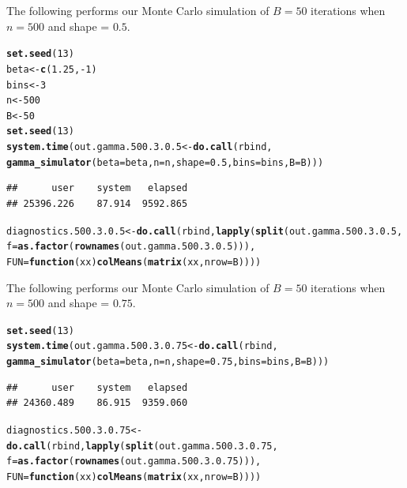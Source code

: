 \documentclass[11pt]{article}\usepackage[]{graphicx}\usepackage[]{color}
\makeatletter
\newcommand{\hlnum}[1]{\textcolor[rgb]{0.686,0.059,0.569}{#1}}%
\newcommand{\hlopt}[1]{\textcolor[rgb]{0,0,0}{#1}}%
\newcommand{\hlstd}[1]{\textcolor[rgb]{0.345,0.345,0.345}{#1}}%
\newcommand{\hlkwa}[1]{\textcolor[rgb]{0.161,0.373,0.58}{\textbf{#1}}}%
\newcommand{\hlkwb}[1]{\textcolor[rgb]{0.69,0.353,0.396}{#1}}%
\newcommand{\hlkwc}[1]{\textcolor[rgb]{0.333,0.667,0.333}{#1}}%
\newcommand{\hlkwd}[1]{\textcolor[rgb]{0.737,0.353,0.396}{\textbf{#1}}}%
\newenvironment{kframe}{%
 \def\at@end@of@kframe{}%
 \ifinner\ifhmode%
  \def\at@end@of@kframe{\end{minipage}}%
  \begin{minipage}{\columnwidth}%
 \fi\fi%
 \def\FrameCommand##1{\hskip\@totalleftmargin \hskip-\fboxsep
 \colorbox{shadecolor}{##1}\hskip-\fboxsep
     \hskip-\linewidth \hskip-\@totalleftmargin \hskip\columnwidth}%
 \MakeFramed {\advance\hsize-\width
   \@totalleftmargin\z@ \linewidth\hsize
   \@setminipage}}%
 {\par\unskip\endMakeFramed%
 \at@end@of@kframe}
\newenvironment{knitrout}{}{} %
\makeatother
\begin{document}
The following performs our Monte Carlo simulation of $B = 50$ iterations 
when $n = 500$ and shape = $0.5$. 

\begin{knitrout}
\color{fgcolor}\begin{kframe}
\begin{alltt}
\hlkwd{set.seed}\hlstd{(}\hlnum{13}\hlstd{)}
\hlstd{beta} \hlkwb{<-} \hlkwd{c}\hlstd{(}\hlnum{1.25}\hlstd{,} \hlopt{-}\hlnum{1}\hlstd{)}
\hlstd{bins} \hlkwb{<-} \hlnum{3}
\hlstd{n} \hlkwb{<-} \hlnum{500}
\hlstd{B} \hlkwb{<-} \hlnum{50}
\hlkwd{set.seed}\hlstd{(}\hlnum{13}\hlstd{)}
\hlkwd{system.time}\hlstd{(out.gamma.500.3.0.5} \hlkwb{<-} \hlkwd{do.call}\hlstd{(rbind,}
  \hlkwd{gamma_simulator}\hlstd{(}\hlkwc{beta} \hlstd{= beta,} \hlkwc{n} \hlstd{= n,} \hlkwc{shape} \hlstd{=} \hlnum{0.5}\hlstd{,} \hlkwc{bins} \hlstd{= bins,} \hlkwc{B} \hlstd{= B)))}
\end{alltt}
\begin{verbatim}
##      user    system   elapsed 
## 25396.226    87.914  9592.865
\end{verbatim}
\begin{alltt}
\hlstd{diagnostics.500.3.0.5} \hlkwb{<-} \hlkwd{do.call}\hlstd{(rbind,} \hlkwd{lapply}\hlstd{(}\hlkwd{split}\hlstd{(out.gamma.500.3.0.5,}
  \hlkwc{f} \hlstd{=} \hlkwd{as.factor}\hlstd{(}\hlkwd{rownames}\hlstd{(out.gamma.500.3.0.5))),}
  \hlkwc{FUN} \hlstd{=} \hlkwa{function}\hlstd{(}\hlkwc{xx}\hlstd{)} \hlkwd{colMeans}\hlstd{(}\hlkwd{matrix}\hlstd{(xx,} \hlkwc{nrow} \hlstd{= B))))}
\end{alltt}
\end{kframe}
\end{knitrout}


The following performs our Monte Carlo simulation of $B = 50$ iterations 
when $n = 500$ and shape = $0.75$.

\begin{knitrout}
\color{fgcolor}\begin{kframe}
\begin{alltt}
\hlkwd{set.seed}\hlstd{(}\hlnum{13}\hlstd{)}
\hlkwd{system.time}\hlstd{(out.gamma.500.3.0.75} \hlkwb{<-} \hlkwd{do.call}\hlstd{(rbind,}
  \hlkwd{gamma_simulator}\hlstd{(}\hlkwc{beta} \hlstd{= beta,} \hlkwc{n} \hlstd{= n,} \hlkwc{shape} \hlstd{=} \hlnum{0.75}\hlstd{,} \hlkwc{bins} \hlstd{= bins,} \hlkwc{B} \hlstd{= B)))}
\end{alltt}
\begin{verbatim}
##      user    system   elapsed 
## 24360.489    86.915  9359.060
\end{verbatim}
\begin{alltt}
\hlstd{diagnostics.500.3.0.75} \hlkwb{<-} \hlkwd{do.call}\hlstd{(rbind,} \hlkwd{lapply}\hlstd{(}\hlkwd{split}\hlstd{(out.gamma.500.3.0.75,}
  \hlkwc{f} \hlstd{=} \hlkwd{as.factor}\hlstd{(}\hlkwd{rownames}\hlstd{(out.gamma.500.3.0.75))),}
  \hlkwc{FUN} \hlstd{=} \hlkwa{function}\hlstd{(}\hlkwc{xx}\hlstd{)} \hlkwd{colMeans}\hlstd{(}\hlkwd{matrix}\hlstd{(xx,} \hlkwc{nrow} \hlstd{= B))))}
\end{alltt}
\end{kframe}
\end{knitrout}
\end{document}
